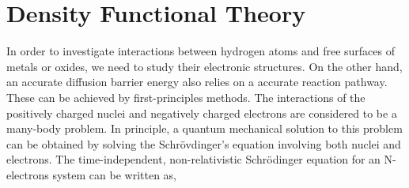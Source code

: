 \section{Density Functional Theory}
\label{Chap:Mech:DFT}

In order to investigate interactions between hydrogen atoms and free surfaces of metals or oxides, we need to study their electronic structures. On the other hand, an accurate diffusion barrier energy also relies on a accurate reaction pathway. These can be achieved by first-principles methods. The interactions of the positively charged nuclei and negatively charged electrons are considered to be a many-body problem. In principle, a quantum mechanical solution to this problem can be obtained by solving the Schr\"{o}vdinger’s equation involving both nuclei and electrons. The time-independent, non-relativistic Schr\"{o}dinger equation for an N-electrons system can be written as,